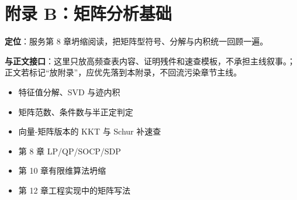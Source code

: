 \chapter{附录 B：矩阵分析基础}

\label{app:b}

\begin{introduction}[内容提要]
        \item \textbf{定位}：服务第 8 章坍缩阅读，把矩阵型符号、分解与内积统一回顾一遍。
\item \textbf{与正文接口}：这里只放高频查表内容、证明残件和速查模板，不承担主线叙事。；正文若标记“放附录”，应优先落到本附录，不回流污染章节主线。
      \end{introduction}

\begin{definition}[收录范围]
        \begin{itemize}
  \item 特征值分解、SVD 与迹内积
  \item 矩阵范数、条件数与半正定判定
  \item 向量-矩阵版本的 KKT 与 Schur 补速查
\end{itemize}
        \end{definition}

\begin{example}[使用时机]
        \begin{itemize}
  \item 第 8 章 LP/QP/SOCP/SDP
  \item 第 10 章有限维算法坍缩
  \item 第 12 章工程实现中的矩阵写法
\end{itemize}
        \end{example}
